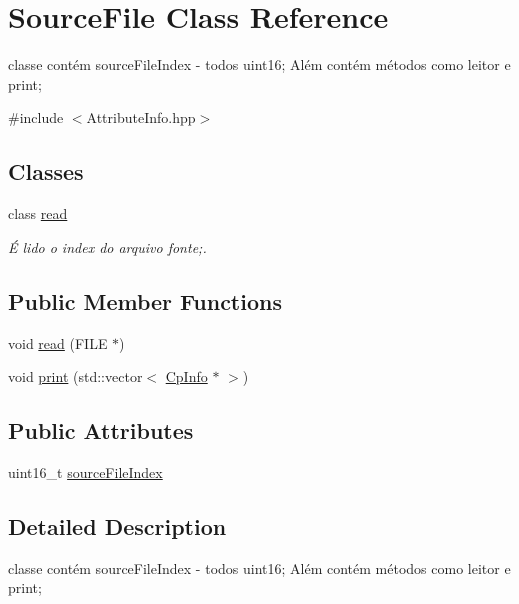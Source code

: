 \hypertarget{class_source_file}{}\section{Source\+File Class Reference}
\label{class_source_file}


classe contém source\+File\+Index -\/ todos uint16; Além contém métodos como leitor e print;  




{\ttfamily \#include $<$Attribute\+Info.\+hpp$>$}

\subsection*{Classes}
\begin{DoxyCompactItemize}
\item 
class \hyperlink{class_source_file_1_1read}{read}
\begin{DoxyCompactList}\small\item\em É lido o index do arquivo fonte;. \end{DoxyCompactList}\end{DoxyCompactItemize}
\subsection*{Public Member Functions}
\begin{DoxyCompactItemize}
\item 
void \hyperlink{class_source_file_ab03dce42dd5c3f890ac4efa38e9d93e6}{read} (F\+I\+LE $\ast$)
\item 
void \hyperlink{class_source_file_ab60e06ebfcc9d1c9d0dda817cca0fc10}{print} (std\+::vector$<$ \hyperlink{class_cp_info}{Cp\+Info} $\ast$ $>$)
\end{DoxyCompactItemize}
\subsection*{Public Attributes}
\begin{DoxyCompactItemize}
\item 
uint16\+\_\+t \hyperlink{class_source_file_a3786d0b21d98b8fe5cd7ca9840a12975}{source\+File\+Index}
\end{DoxyCompactItemize}


\subsection{Detailed Description}
classe contém source\+File\+Index -\/ todos uint16; Além contém métodos como leitor e print; 

